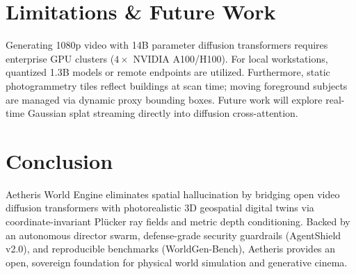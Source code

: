 \documentclass[10pt,twocolumn,letterpaper]{article}
\begin{document}
\section{Limitations \& Future Work}

Generating 1080p video with 14B parameter diffusion transformers requires enterprise GPU clusters ($4\times$ NVIDIA A100/H100). For local workstations, quantized 1.3B models or remote endpoints are utilized. Furthermore, static photogrammetry tiles reflect buildings at scan time; moving foreground subjects are managed via dynamic proxy bounding boxes. Future work will explore real-time Gaussian splat streaming directly into diffusion cross-attention.

\section{Conclusion}

Aetheris World Engine eliminates spatial hallucination by bridging open video diffusion transformers with photorealistic 3D geospatial digital twins via coordinate-invariant Pl\"ucker ray fields and metric depth conditioning. Backed by an autonomous director swarm, defense-grade security guardrails (AgentShield v2.0), and reproducible benchmarks (WorldGen-Bench), Aetheris provides an open, sovereign foundation for physical world simulation and generative cinema.



\end{document}
